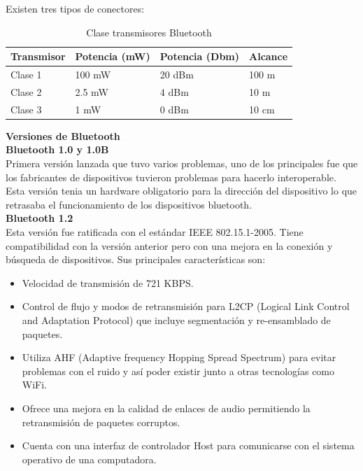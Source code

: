 \documentclass[11pt,openany]{book}
\newcounter{ns}
\begin{document}
	Existen tres tipos de conectores:

	\begin{table}[htbp]
			\begin{tabular}{|l|l|l|l|}\hline

				\textbf{Transmisor} & \textbf{Potencia (mW)} & \textbf{Potencia (Dbm)} & \textbf{Alcance} \\ \hline
				Clase 1 & 100 mW & 20 dBm & 100 m \\ \hline
				Clase 2 & 2.5 mW & 4 dBm & 10 m \\ \hline
				Clase 3 & 1 mW & 0 dBm & 10 cm \\ \hline

			\end{tabular}
				\caption{Clase transmisores Bluetooth}
		\end{table}

		\textbf{Versiones de Bluetooth}\\
		\textbf{Bluetooth 1.0 y 1.0B}\\
		Primera versión lanzada que tuvo varios problemas, uno de los principales fue que los fabricantes de dispositivos tuvieron problemas para hacerlo interoperable. Esta versión tenia un hardware obligatorio para la dirección del dispositivo lo que retrasaba el funcionamiento de los dispositivos bluetooth.\\

		\textbf{Bluetooth 1.2}\\
		Esta versión fue ratificada con el estándar IEEE 802.15.1-2005. Tiene compatibilidad con la versión anterior pero con una mejora en la conexión y búsqueda de dispositivos. Sus principales características son:
		\begin{itemize}
			\item Velocidad de transmisión de 721 KBPS.
			\item Control de flujo y modos de retransmisión para L2CP (Logical Link Control and Adaptation Protocol) que incluye segmentación y re-ensamblado de paquetes.
			\item Utiliza AHF (Adaptive frequency Hopping Spread Spectrum) para evitar problemas con el ruido y así poder existir junto a otras tecnologías como WiFi.
			\item Ofrece una mejora en la calidad de enlaces de audio permitiendo la retransmisión de paquetes corruptos.
			\item Cuenta con una interfaz de controlador Host para comunicarse con el sistema operativo de una computadora.
		\end{itemize}
\end{document}
